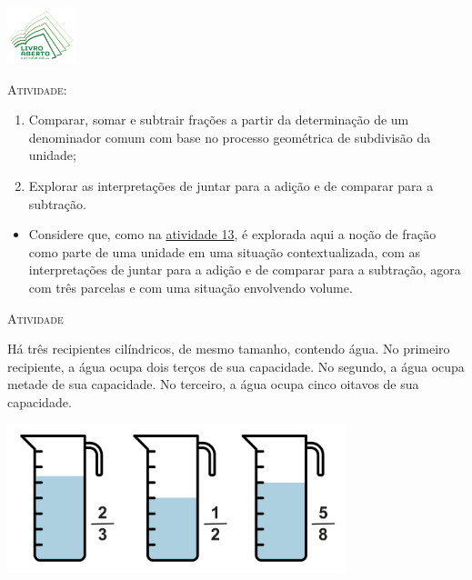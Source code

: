 \documentclass[10 pt,usenames,dvipsnames, oneside]{article}
\begin{document}
\begin{center}
  \begin{minipage}[l]{3cm}
\includegraphics[width=2cm]{../../../Figuras/logo}       
\end{minipage}\hfill
\begin{minipage}[r]{.8\textwidth}
 {\Large \scshape Atividade: }  
\end{minipage}
\end{center}
\vspace{.2cm}

\ifdefined\prof
\begin{goals}
\begin{enumerate}
    \item       Comparar, somar e subtrair frações a partir da determinação de um denominador comum com base no processo geométrica de subdivisão da unidade;
    \item       Explorar as interpretações de juntar para a adição e de comparar para a subtração.

\end{enumerate}

\tcblower

\begin{itemize}
    \item       Considere que, como na \hyperref[chap5-ativ13]{atividade 13}, é explorada aqui a noção de fração como parte de uma unidade em uma situação contextualizada, com as interpretações de juntar para a adição e de comparar para a subtração, agora com três parcelas e com uma situação envolvendo volume.
\end{itemize}
\end{goals}

\bigskip
\begin{center}
{\large \scshape Atividade}
\end{center}
\fi

Há três recipientes cilíndricos, de mesmo tamanho, contendo água. No primeiro recipiente, a água ocupa dois terços de sua capacidade. No segundo, a água ocupa metade de sua capacidade. No terceiro, a água ocupa cinco oitavos de sua capacidade.

\begin{center}
  \includegraphics[width=280pt, keepaspectratio]{ativ14_fig01.png}
\end{center}
\end{document}
